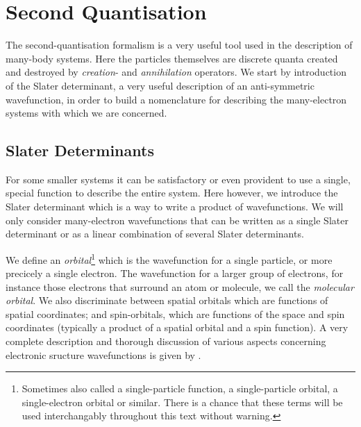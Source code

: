 \chapter{Second Quantisation}
 
The second-quantisation formalism is a very useful tool used in the description of 
many-body systems. Here the particles themselves are discrete quanta created and 
destroyed by \emph{creation}- and \emph{annihilation} operators. We start by introduction 
of the Slater determinant, a very useful description of an anti-symmetric wavefunction,
in order to build a nomenclature for describing the many-electron systems with 
which we are concerned.

\section{Slater Determinants}

For some smaller
systems it can be satisfactory or even provident to use a single, special function 
to describe the entire system. Here however, we introduce the Slater determinant which 
is a way to write a product of wavefunctions.  
We will only consider many-electron wavefunctions that can be written as a single 
Slater determinant or as a linear combination of several Slater determinants.

We define an \emph{orbital}\footnote{Sometimes also called a single-particle function,
a single-particle orbital, a single-electron orbital or similar. There is a chance that 
these terms will be used interchangably throughout this text without warning.} which is the
wavefunction for a single particle, or more precicely a single electron. The wavefunction
for a larger group of electrons,
for instance those electrons that surround an atom or molecule,
we call the \emph{molecular orbital}. We also discriminate between 
spatial orbitals which are functions of spatial coordinates; and spin-orbitals, which 
are functions of the space and spin coordinates (typically a product of a spatial orbital
and a spin function). A very complete description and thorough discussion of various aspects 
concerning electronic sructure wavefunctions is given 
by \citeauthor{szabo2012modern} \cite{szabo2012modern}.


